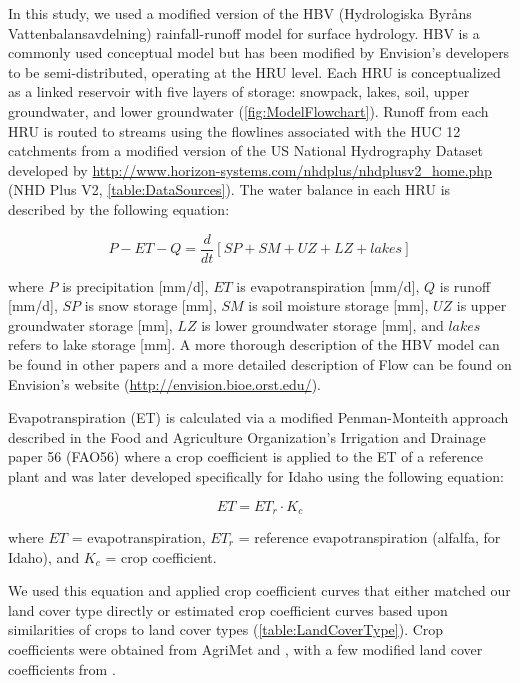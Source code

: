\documentclass[11pt,letterpaper]{article}
\begin{document}
In this study, we used a modified version of the HBV (Hydrologiska Byr\r{a}ns Vattenbalansavdelning) rainfall-runoff model \citep{Bergstrom:1976tr} for surface hydrology. HBV is a commonly used conceptual model \citep{Seibert:2000wi,Woodsmith:2007vz,Abebe:2010to,Bergstrom:2015ck} but has been modified by Envision’s developers to be semi-distributed, operating at the HRU level. Each HRU is conceptualized as a linked reservoir with five layers of storage: snowpack, lakes, soil, upper groundwater, and lower groundwater (\cref{fig:ModelFlowchart}). Runoff from each HRU is routed to streams using the flowlines associated with the HUC 12 catchments from a modified version of the US National Hydrography Dataset developed by \href{Horizon Systems, Inc.}{http://www.horizon-systems.com/nhdplus/nhdplusv2\_home.php} (NHD Plus V2, \cref{table:DataSources}). The water balance in each HRU is described by the following equation:

\begin{equation}
P - ET - Q = \frac{d}{dt}\left[SP + SM + UZ + LZ + lakes\right]
\end{equation}

where $P$ is precipitation [mm/d], $ET$ is evapotranspiration [mm/d], $Q$ is runoff [mm/d], $SP$ is snow storage [mm], $SM$ is soil moisture storage [mm], $UZ$ is upper groundwater storage [mm], $LZ$ is lower groundwater storage [mm], and $lakes$ refers to lake storage [mm]. A more thorough description of the HBV model can be found in other papers \citep{Seibert:1999vg,Bergstrom:2015ck} and a more detailed description of Flow can be found on Envision’s website (\href{http://envision.bioe.orst.edu/}{http://envision.bioe.orst.edu/}).

Evapotranspiration (ET) is calculated via a modified Penman-Monteith approach described in the Food and Agriculture Organization’s Irrigation and Drainage paper 56 (FAO56) where a crop coefficient is applied to the ET of a reference plant \citep{Allen:vn} and was later developed specifically for Idaho \citep{Allen:2007ta} using the following equation:

\begin{equation}
ET = ET_r \cdot K_c
\end{equation}

where $ET$ = evapotranspiration, $ET_r$ = reference evapotranspiration (alfalfa, for Idaho), and $K_c$ = crop coefficient.

We used this equation and applied crop coefficient curves that either matched our land cover type directly or estimated crop coefficient curves based upon similarities of crops to land cover types (\cref{table:LandCoverType}). Crop coefficients were obtained from AgriMet and \citep{Allen:2007ta}, with a few modified land cover coefficients from \citep{Inouye:2014ws}.  
\end{document}
